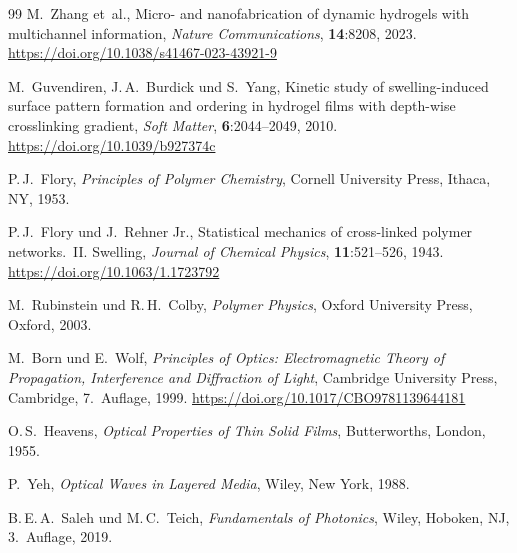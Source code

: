 ﻿\documentclass[a4paper,12pt]{article}
\theoremstyle{definition}
\begin{document}
\begin{thebibliography}{99}
		M.~Zhang et~al.,
		\newblock Micro- and nanofabrication of dynamic hydrogels with multichannel
		information,
		\newblock \emph{Nature Communications}, \textbf{14}:8208, 2023.
		\newblock \url{https://doi.org/10.1038/s41467-023-43921-9}
		
		M.~Guvendiren, J.\,A.~Burdick und S.~Yang,
		\newblock Kinetic study of swelling-induced surface pattern formation and
		ordering in hydrogel films with depth-wise crosslinking gradient,
		\newblock \emph{Soft Matter}, \textbf{6}:2044--2049, 2010.
		\newblock \url{https://doi.org/10.1039/b927374c}
		
		
		P.\,J.~Flory,
		\newblock \emph{Principles of Polymer Chemistry},
		\newblock Cornell University Press, Ithaca, NY, 1953.
		
		P.\,J.~Flory und J.~Rehner Jr.,
		\newblock Statistical mechanics of cross-linked polymer networks.~{II.}
		Swelling,
		\newblock \emph{Journal of Chemical Physics}, \textbf{11}:521--526, 1943.
		\newblock \url{https://doi.org/10.1063/1.1723792}
		
		M.~Rubinstein und R.\,H.~Colby,
		\newblock \emph{Polymer Physics},
		\newblock Oxford University Press, Oxford, 2003.
		
		
		M.~Born und E.~Wolf,
		\newblock \emph{Principles of Optics: Electromagnetic Theory of Propagation,
			Interference and Diffraction of Light},
		\newblock Cambridge University Press, Cambridge, 7.~Auflage, 1999.
		\newblock \url{https://doi.org/10.1017/CBO9781139644181}
		
		O.\,S.~Heavens,
		\newblock \emph{Optical Properties of Thin Solid Films},
		\newblock Butterworths, London, 1955.
		
		P.~Yeh,
		\newblock \emph{Optical Waves in Layered Media},
		\newblock Wiley, New York, 1988.
		
		B.\,E.\,A.~Saleh und M.\,C.~Teich,
		\newblock \emph{Fundamentals of Photonics},
		\newblock Wiley, Hoboken, NJ, 3.~Auflage, 2019.
		

\end{thebibliography}
\end{document}
